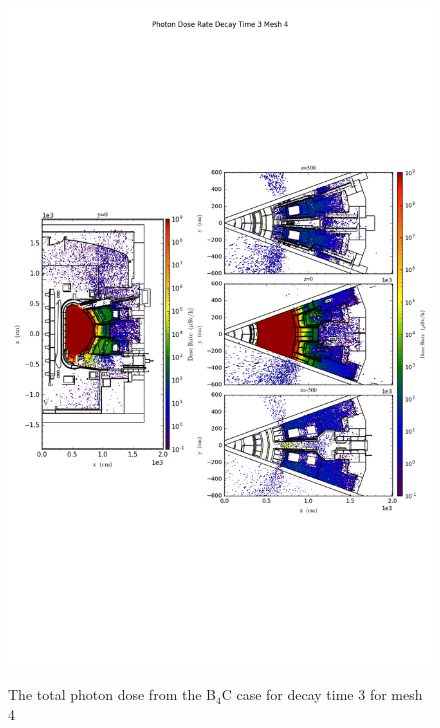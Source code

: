 \begin{figure}[ht!]
\centering
\includegraphics[trim={0cm 9cm 0cm 10cm},clip,scale=0.75]{../plots/final_model_with_b4c/Photon_Dose_Rate_Decay_Time_3_Mesh_4.png}
\label{fig:photons_dc3_no4bc_m4_flux}
\caption{The total photon dose from the B$_4$C case for decay time 3 for mesh 4}
\end{figure}
